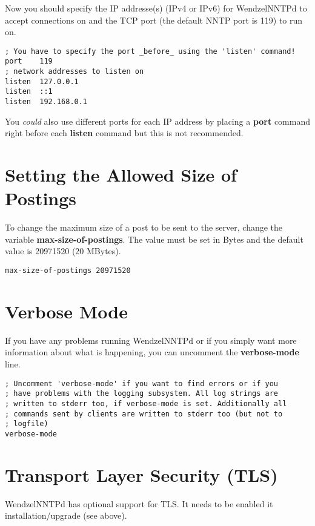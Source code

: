 Now you should specify the IP addresse(s) (IPv4 or IPv6) for WendzelNNTPd to accept connections on and the TCP port (the default NNTP port is 119) to run on.

\begin{verbatim}
; You have to specify the port _before_ using the 'listen' command!
port	119
; network addresses to listen on
listen	127.0.0.1
listen	::1
listen	192.168.0.1
\end{verbatim}

You \textit{could} also use different ports for each IP address by placing a \textbf{port} command right before each \textbf{listen} command but this is not recommended.

\section{Setting the Allowed Size of Postings}

To change the maximum size of a post to be sent to the server, change the variable \textbf{max-size-of-postings}. The value must be set in Bytes and the default value is 20971520 (20 MBytes).

\begin{verbatim}
max-size-of-postings 20971520
\end{verbatim}

\section{Verbose Mode}

If you have any problems running WendzelNNTPd or if you simply want more information about what is happening, you can uncomment the \textbf{verbose-mode} line.

\begin{verbatim}
; Uncomment 'verbose-mode' if you want to find errors or if you
; have problems with the logging subsystem. All log strings are
; written to stderr too, if verbose-mode is set. Additionally all
; commands sent by clients are written to stderr too (but not to
; logfile)
verbose-mode
\end{verbatim}

\section{Transport Layer Security (TLS)}

WendzelNNTPd has optional support for TLS. It needs to be enabled it installation/upgrade (see above).

